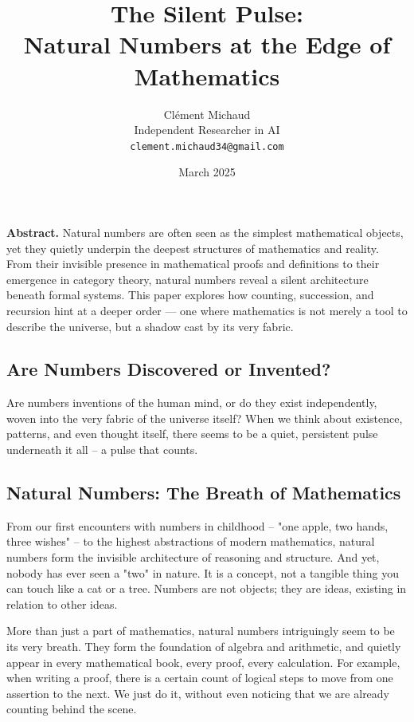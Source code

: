 \documentclass{article}
\title{The Silent Pulse: \\ Natural Numbers at the Edge of Mathematics}
\author{
Clément Michaud \\
\small{Independent Researcher in AI} \\
\small{\texttt{clement.michaud34@gmail.com}}
}
\date{March 2025}
\begin{document}
\maketitle

\begin{center}
\begin{minipage}{0.9\textwidth}
\small
\textbf{Abstract.} Natural numbers \cite{natural_numbers} are often seen as the simplest mathematical objects, yet they quietly underpin the deepest structures of mathematics and reality. From their invisible presence in mathematical proofs and definitions to their emergence in category theory, natural numbers reveal a silent architecture beneath formal systems. This paper explores how counting, succession, and recursion hint at a deeper order — one where mathematics is not merely a tool to describe the universe, but a shadow cast by its very fabric.
\end{minipage}
\end{center}

\vspace{10pt}

\subsection*{Are Numbers Discovered or Invented?}
Are numbers inventions of the human mind, or do they exist independently, woven into the very fabric of the universe itself? When we think about existence, patterns, and even thought itself, there seems to be a quiet, persistent pulse underneath it all -- a pulse that counts.

\subsection*{Natural Numbers: The Breath of Mathematics}
From our first encounters with numbers in childhood -- "one apple, two hands, three wishes" -- to the highest abstractions of modern mathematics, natural numbers \cite{natural_numbers} form the invisible architecture of reasoning and structure. And yet, nobody has ever seen a "two" in nature. It is a concept, not a tangible thing you can touch like a cat or a tree. Numbers are not objects; they are ideas, existing in relation to other ideas.

More than just a part of mathematics, natural numbers intriguingly seem to be its very breath. They form the foundation of algebra and arithmetic, and quietly appear in every mathematical book, every proof, every calculation. For example, when writing a proof, there is a certain count of logical steps to move from one assertion to the next. We just do it, without even noticing that we are already counting behind the scene.
\end{document}
